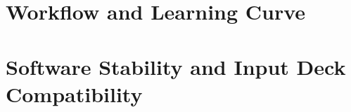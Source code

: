 \documentclass[12pt,report,justified]{SANDreport}
\begin{document}
\section{Workflow and Learning Curve}

% 
% 
\section{Software Stability and Input Deck Compatibility}

% 
% 
\end{document}
